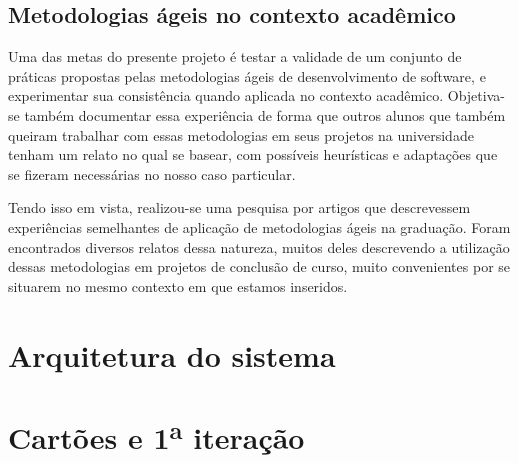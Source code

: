 \documentclass[a4paper,12pt,font=plain,header=plain]{abnt}
\begin{document}

    \subsection{Metodologias ágeis no contexto acadêmico}
      Uma das metas do presente projeto é testar a validade de um conjunto de práticas propostas pelas metodologias ágeis de desenvolvimento de software, e experimentar sua consistência quando aplicada no contexto acadêmico. Objetiva-se também documentar essa experiência de forma que outros alunos que também queiram trabalhar com essas metodologias em seus projetos na universidade tenham um relato no qual se basear, com possíveis heurísticas e adaptações que se fizeram necessárias no nosso caso particular.

      Tendo isso em vista, realizou-se uma pesquisa por artigos que descrevessem experiências semelhantes de aplicação de metodologias ágeis na graduação. Foram encontrados diversos relatos dessa natureza, muitos deles descrevendo a utilização dessas metodologias em projetos de conclusão de curso, muito convenientes por se situarem no mesmo contexto em que estamos inseridos.

  \section{Arquitetura do sistema}

  \section{Cartões e 1\textsuperscript{a} iteração}
\end{document}
